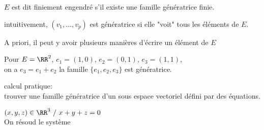 \documentclass[../main.tex]{subfile}
\begin{document}
\begin{vocab}
	$E$ est dit finiement engendré s'il existe une famille génératrice finie.
\end{vocab}

\begin{rema}
	intuitivement, $(v_1, ..., v_p)$ est génératrice si elle "voit" tous les éléments de $E$.
\end{rema}

\begin{rema}
	A priori, il peut y avoir plusieurs manières d'écrire un élément de $E$
\end{rema}

\begin{ex}
	Pour $E = \RR^2$, $e_1 = (1, 0)$, $e_2=(0, 1)$, $e_3 = (1, 1)$, \\
	on a $e_3 = e_1 + e_2$
	la famille $\{e_1, e_2, e_3\}$ est génératrice.
\end{ex}

calcul pratique:\\
trouver une famille génératrice d'un sous espace vectoriel défini par des équations.\\
\begin{ex}
	$(x, y, z) \in \RR^3 \ / \ x + y + z = 0$\\
	On résoud le système %
\end{ex}
\end{document}
